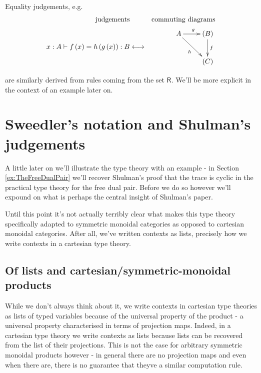 \documentclass[pra,floatfix,
amsmath,superscriptaddress, 12pt]{article}
\theoremstyle{definition}
\newcommand{\msf}[1]{\mathsf{#1}}
\begin{document}
Equality judgements, e.g.
\begin{eqnarray*}
    \mathrm{judgements}
        &
            &
            \mathrm{commuting \ diagrams}
                \\
    x:A\vdash f\left(x\right)=h\left(g\left(x\right)\right):B
        &
        \longleftrightarrow
            &
            \vcenter{
                \vbox{
                    \xymatrix{
                        A
                        \ar[r]^{g}
                        \ar[dr]_{h}
                            &
                            (B)
                            \ar[d]^{f}
                                \\
                            &
                                \left( C \right)}}}
\end{eqnarray*}

are similarly derived from rules coming from the set $\msf{R}$. We'll be more explicit in the context of an example later on.

\section{Sweedler's notation and Shulman's judgements}

A little later on we'll illustrate the type theory with an example - in Section \ref{ex:TheFreeDualPair} we'll recover Shulman's proof that the trace is cyclic in the practical type theory for the free dual pair. Before we do so however we'll expound on what is perhaps the central insight of Shulman's paper.

Until this point it's not actually terribly clear what makes this type theory specifically adapted to symmetric monoidal categories as opposed to cartesian monoidal categories. After all, we've written contexts as lists, precisely how we write contexts in a cartesian type theory. 

\subsection{Of lists and cartesian/symmetric-monoidal products}

While we don't always think about it, we write contexts in cartesian type theories as lists of typed variables because of the universal property of the product - a universal property characterised in terms of projection maps. Indeed, in a cartesian type theory we write contexts as lists because lists can be recovered from the list of their projections. This is not the case for arbitrary symmetric monoidal products however - in general there are no projection maps and even when there are, there is no guarantee that theyve a similar computation rule.
\end{document}
